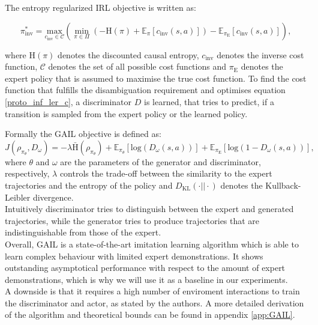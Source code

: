 The entropy regularized IRL objective is written as:

\begin{equation}
    \label{proto_inf_ler_c}
    \pi_{\text{inv}}^* = \underset{c_{\text{inv}} \in \mathcal{C}}{\text{max}} \left( \min_{\pi \in \Pi} \left(- \text{H}(\pi) + \mathbb{E}_{\pi}[c_{\text{inv}}(s, a)] \right) - \mathbb{E}_{\pi_{\text{E}}}[c_{\text{inv}}(s,a)] \right),
\end{equation}
    
where $\text{H}(\pi)$ denotes the discounted causal 
entropy, $c_{\text{inv}}$ denotes the inverse cost function, $\mathcal{C}$ denotes the set of all possible cost functions and $\pi_{\text{E}}$ denotes the expert policy that is assumed to maximise the true cost function.
To find the cost function that fulfills the disambiguation requirement and optimises equation \ref{proto_inf_ler_c}, a discriminator $D$ is learned, that tries to predict, if a transition is 
sampled from the expert policy or the learned policy.  

Formally the GAIL objective is defined as:
\begin{equation}
    J(\rho_{\pi_{\theta}}, D_{\omega}) =  - \lambda \bar{\text{H}}(\rho_{\pi_{\theta}} ) + \mathbb{E}_{\pi_{\theta}}\left[ \text{log}(D_{\omega}(s,a))\right] + \mathbb{E}_{\pi_{\text{E}}}\left[ \text{log}(1 - D_{\omega}(s,a))\right],
\end{equation}
where $\theta$ and $\omega$ are the parameters of the generator and discriminator, respectively, 
$\lambda$ controls the trade-off between the similarity to the expert trajectories and the entropy of the policy and $D_{\text{KL}}(\cdot || \cdot)$ denotes the Kullback-Leibler divergence. \\
Intuitively discriminator tries to distinguish between the expert and generated trajectories, while the generator tries to produce trajectories that are indistinguishable from those of the expert.\\

Overall, GAIL is a state-of-the-art imitation learning algorithm which is able to learn complex behaviour with limited expert demonstrations. It shows outstanding 
asymptotical performance with respect to the amount of expert demonstrations, which is why we will use it as a baseline in our experiments.\\ 
A downside is that it requires a high number of enviroment interactions to train the discriminator and actor, as stated by the authors. A more detailed derivation of the algorithm and theoretical 
bounds can be found in appendix \ref{app:GAIL}.


